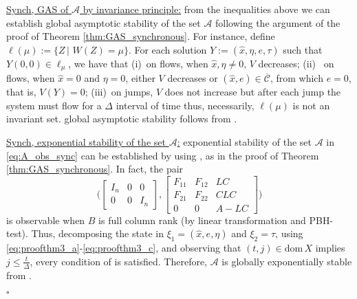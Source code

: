 \documentclass[twocolumn]{autart}
\newenvironment{proofof}{\noindent {\em Proof of }}{\hfill \hspace*{1pt}
\hfill $\square$}
\newcommand{\smallmat}[1]{\left[ \begin{smallmatrix}#1
    \end{smallmatrix} \right]}
\newcommand{\dom}{\mathrm{dom}}
\begin{document}
\begin{proofof}{\emph{Theorem \ref{thm:GASoutput}}.}
{ \underline{Synch, GAS of $\mathcal{A}$ by invariance principle:}} 
from the inequalities above we can establish global asymptotic stability of the set $\mathcal{A}$
following the argument of the proof of Theorem \ref{thm:GAS_synchronous}.
For instance, define 
$\ell(\mu) := \{Z\,|\,\,W(Z)=\mu\}$. 
For each solution $Y:=(\hat{x},\eta,e,\tau)$ such that $Y(0,0) \in \ell_\mu$, we have that  
(i)~on flows, when  $\hat{x}, \eta \neq 0$, $V$ decreases; 
(ii)~ on flows, when $\hat{x} = 0$ and $\eta =0$, either $V$ decreases 
or $(\hat{x},e)\in \overline{\mathcal{C}}$, from which $e=0$, that is, $V(Y) =0$; 
(iii)~on jumps, $V$ does not increase but after each jump the system must flow for a $\Delta$ interval 
of time thus, necessarily, $\ell(\mu)$ is not an invariant set. 
global asymptotic stability follows from \cite[Theorem 23]{GoebelCSM09}.

{ \underline{Synch, exponential stability of the set $\mathcal{A}$:}}
exponential stability of the set $\mathcal{A}$ in \eqref{eq:A_obs_sync}
can be established by using \cite[Theorem 2]{TeelTAC13},
as in the proof of Theorem \ref{thm:GAS_synchronous}. In fact, 
the pair 
\begin{equation}
\label{eq:pair_obs}
\Big(\smallmat{
I_n & 0 & 0 \\
0 & 0 & I_n
},
\smallmat{
F_{11} & F_{12} & LC \\
F_{21} & F_{22} & CLC \\
0 & 0 & A-LC
}
\Big) 
\end{equation}
is observable when $B$ is full column rank 
(by linear transformation and PBH-test).
Thus, decomposing the state  
in $\xi_1 = (\hat{x},e,\eta)$ and $\xi_2 = \tau$,
using \eqref{eq:proofthm3_a}-\eqref{eq:proofthm3_c},
and observing that 
$(t,j)\in \dom\,X$ implies $j \leq \frac{t}{\Delta}$,
every condition of \cite[Assumption 1]{TeelTAC13} is satisfied.
Therefore, $\mathcal{A}$ is globally exponentially stable
from \cite[Theorem 2]{TeelTAC13}.


\end{proofof}
\end{document}
